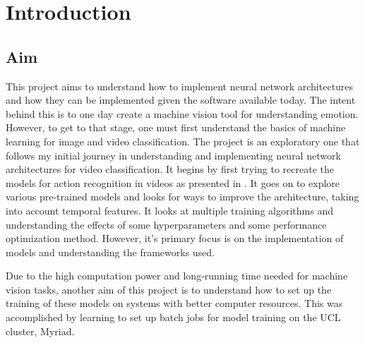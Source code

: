 \chapter{Introduction}
\label{chapterlabel1}

\section{Aim}
This project aims to understand how to implement neural network architectures and how they can be implemented given the software available today. 
The intent behind this is to one day create a machine vision tool for understanding emotion. However, to get to that stage, one must first understand the basics of machine learning for image and video classification. 
The project is an exploratory one that follows my initial journey in understanding and implementing neural network architectures for video classification. 
It begins by first trying to recreate the models for action recognition in videos as presented in .
 It goes on to explore various pre-trained models and looks for ways to improve the architecture, taking into account temporal features. 
It looks at multiple training algorithms and understanding the effects of some hyperparameters and some performance optimization method. However, it's primary focus is on the implementation of models and understanding the frameworks used. 

Due to the high computation power and long-running time needed for machine vision tasks, another aim of this project is to understand how to set up the training of these models on systems with better computer resources. 
This was accomplished by learning to set up batch jobs for model training on the UCL cluster, Myriad.






